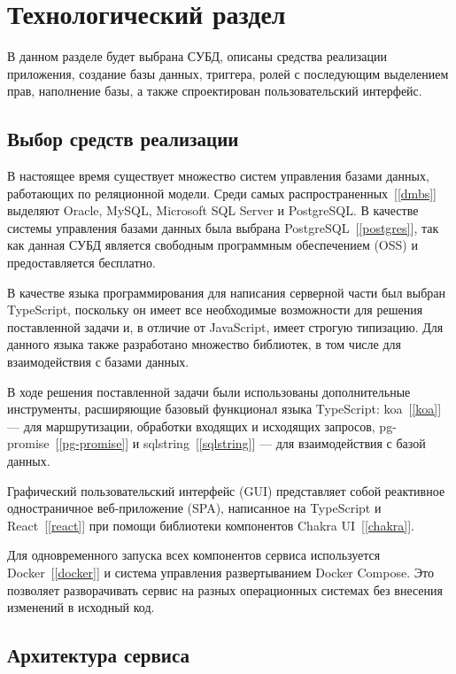 \chapter{Технологический раздел}

В данном разделе будет выбрана СУБД, описаны средства реализации приложения, создание базы данных, триггера, ролей с последующим выделением прав, наполнение базы, а также спроектирован пользовательский интерфейс.

\section{Выбор средств реализации}

В настоящее время существует множество систем управления базами данных, работающих по реляционной модели. Среди самых распространенных~[\ref{dmbs}] выделяют Oracle, MySQL, Microsoft SQL Server и PostgreSQL. В качестве системы управления базами данных была выбрана PostgreSQL~[\ref{postgres}], так как данная СУБД является свободным программным обеспечением (OSS) и предоставляется бесплатно.

В качестве языка программирования для написания серверной части был выбран TypeScript, поскольку он имеет все необходимые возможности для решения поставленной задачи и, в отличие от JavaScript, имеет строгую типизацию. Для данного языка также разработано множество библиотек, в том числе для взаимодействия с базами данных.

В ходе решения поставленной задачи были использованы дополнительные инструменты, расширяющие базовый функционал языка TypeScript: koa~[\ref{koa}] --- для маршрутизации, обработки входящих и исходящих запросов, pg-promise~[\ref{pg-promise}] и sqlstring~[\ref{sqlstring}] --- для взаимодействия с базой данных.

Графический пользовательский интерфейс (GUI) представляет собой реактивное одностраничное веб-приложение (SPA), написанное на TypeScript и React~[\ref{react}] при помощи библиотеки компонентов Chakra UI~[\ref{chakra}].

Для одновременного запуска всех компонентов сервиса используется Docker~[\ref{docker}] и система управления развертыванием Docker Compose. Это позволяет разворачивать сервис на разных операционных системах без внесения изменений в исходный код.

\section{Архитектура сервиса}

